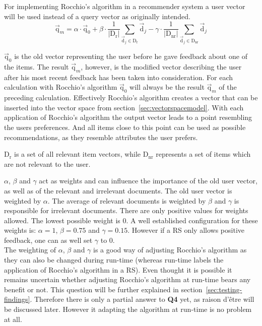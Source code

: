 For implementing Rocchio's algorithm in a recommender system a user vector will be used instead of a query vector as originally intended.
\begin{equation}
    \vec{\text{q}}_m =
        \alpha \cdot \vec{\text{q}}_0
        + \beta \cdot \frac{1}{|\text{D}_\text{r}|}\sum_{\vec{\text{d}}_j\in \text{D}_\text{r}} \vec{\text{d}}_j
        - \gamma \cdot \frac{1}{|\text{D}_\text{nr}|}\sum_{\vec{\text{d}}_j\in \text{D}_\text{nr}} \vec{\text{d}}_j
\end{equation}

$\vec{\text{q}}_0$ is the old vector representing the user before he gave feedback about one of the items.
The result $\vec{\text{q}}_m$, however, is the modified vector describing the user after his most recent feedback has been taken into consideration.
For each calculation with Rocchio's algorithm $\vec{\text{q}}_0$ will always be the result $\vec{\text{q}}_m$ of the preceding calculation.
Effectively Rocchio's algorithm creates a vector that can be inserted into the vector space from section~\ref{sec:vectorspacemodel}.
With each application of Rocchio's algorithm the output vector leads to a point resembling the users preferences.
And all items close to this point can be used as possible recommendations, as they resemble attributes the user prefers.

$\text{D}_\text{r}$ is a set of all relevant item vectors, while $\text{D}_\text{nr}$ represents a set of items which are not relevant to the user.

$\alpha$, $\beta$ and $\gamma$ act as weights and can influence the importance of the old user vector, as well as of  the relevant and irrelevant documents.
The old user vector is weighted by $\alpha$.
The average of relevant documents is weighted by $\beta$ and $\gamma$ is responsible for irrelevant documents.
There are only positive values for weights allowed.
The lowest possible weight is 0.
A well established configuration for these weights is: $\alpha = 1$, $\beta = 0.75$ and $\gamma = 0.15$.
However if a RS only allows positive feedback, one can as well set $\gamma$ to 0.
\citep[p.~178-183]{manning:2009}
\\

The weighting of $\alpha$, $\beta$ and $\gamma$ is a good way of adjusting Rocchio's algorithm as they can also be changed during run-time (whereas run-time labels the application of Rocchio's algorithm in a RS).
Even thought it is possible it remains uncertain whether adjusting Rocchio's algorithm at run-time bears any benefit or not.
This question will be further explained in section~\ref{sec:testing-findings}.
Therefore there is only a partial answer to \textbf{Q4} yet, as raison d'\^{e}tre will be discussed later.
However it adapting the algorithm at run-time is no problem at all.

